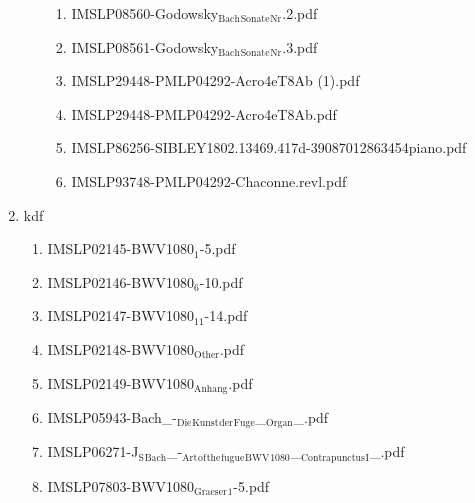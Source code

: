 \documentclass[11pt]{article}
\begin{document}
\begin{enumerate}
\begin{enumerate}
\begin{enumerate}
\item IMSLP08560-Godowsky$_{\text{Bach}}$$_{\text{Sonate}}$$_{\text{Nr}}$.2.pdf
\label{sec-1-1-1-1-44-6-2-3-8}

\item IMSLP08561-Godowsky$_{\text{Bach}}$$_{\text{Sonate}}$$_{\text{Nr}}$.3.pdf
\label{sec-1-1-1-1-44-6-2-3-9}

\item IMSLP29448-PMLP04292-Acro4eT8Ab (1).pdf
\label{sec-1-1-1-1-44-6-2-3-10}

\item IMSLP29448-PMLP04292-Acro4eT8Ab.pdf
\label{sec-1-1-1-1-44-6-2-3-11}

\item IMSLP86256-SIBLEY1802.13469.417d-39087012863454piano.pdf
\label{sec-1-1-1-1-44-6-2-3-12}

\item IMSLP93748-PMLP04292-Chaconne.revl.pdf
\label{sec-1-1-1-1-44-6-2-3-13}
\end{enumerate}
\end{enumerate}

\item kdf
\label{sec-1-1-1-1-44-6-3}
\begin{enumerate}
\item IMSLP02145-BWV1080$_{\text{1}}$-5.pdf
\label{sec-1-1-1-1-44-6-3-1}

\item IMSLP02146-BWV1080$_{\text{6}}$-10.pdf
\label{sec-1-1-1-1-44-6-3-2}

\item IMSLP02147-BWV1080$_{\text{11}}$-14.pdf
\label{sec-1-1-1-1-44-6-3-3}

\item IMSLP02148-BWV1080$_{\text{Other}}$.pdf
\label{sec-1-1-1-1-44-6-3-4}

\item IMSLP02149-BWV1080$_{\text{Anhang}}$.pdf
\label{sec-1-1-1-1-44-6-3-5}

\item IMSLP05943-Bach\_-$_{\text{Die}}$$_{\text{Kunst}}$$_{\text{der}}$$_{\text{Fuge}}$\_$_{\text{Organ}}$\_.pdf
\label{sec-1-1-1-1-44-6-3-6}

\item IMSLP06271-J$_{\text{S}}$$_{\text{Bach}}$\_-$_{\text{Art}}$$_{\text{of}}$$_{\text{the}}$$_{\text{fugue}}$$_{\text{BWV}}$$_{\text{1080}}$\_$_{\text{Contrapunctus}}$$_{\text{I}}$\_.pdf
\label{sec-1-1-1-1-44-6-3-7}

\item IMSLP07803-BWV1080$_{\text{Graeser}}$$_{\text{1}}$-5.pdf
\label{sec-1-1-1-1-44-6-3-8}


\end{enumerate}
\end{enumerate}
\end{document}
